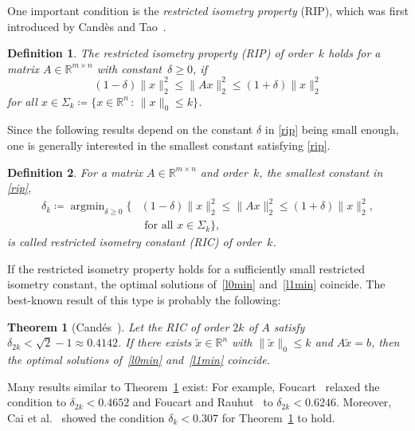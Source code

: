 \documentclass[journal]{IEEEtran}
\newtheorem{theorem}{Theorem}
\newtheorem{definition}{Definition}
\DeclareMathOperator*{\argmin}{argmin}
\newcommand{\suchthat}{\,:\,}
\newcommand{\define}{\coloneqq}
\newcommand{\Norm}[2]{\lVert{#1}\rVert_{#2}}
\newcommand{\R}{\mathds{R}}
\begin{document}
One important condition is the \emph{restricted isometry property} (RIP),
which was first introduced by Cand\`es and Tao~\cite{CT05}. 

\begin{definition}\label{ripdef}
  The \emph{restricted isometry property} (RIP) of order~$k$ holds for a
  matrix $A \in \R^{m \times n}$ with constant~$\delta \geq 0$, if
  \begin{equation}\label{rip}
    (1 - \delta) \Norm{x}{2}^2 \leq \Norm{Ax}{2}^2 \leq (1+\delta) \Norm{x}{2}^2
  \end{equation}
  for all $x \in \Sigma_k \define \{x \in \R^n \suchthat \Norm{x}{0} \leq k\}$.
\end{definition}

Since the following results depend on the constant $\delta$ in \eqref{rip} being
small enough, one is generally interested in the smallest constant satisfying
\eqref{rip}.

\begin{definition}\label{ricdef}
  For a matrix $A \in \R^{m \times n}$ and order~$k$, the smallest constant in 
  \eqref{rip},
  \begin{equation}\label{ric}
    \begin{aligned}
      \delta_k \define \argmin_{\delta \geq 0} \big\{&(1 - \delta) \Norm{x}{2}^2 \leq \Norm{Ax}{2}^2 \leq (1+\delta) \Norm{x}{2}^2 ,\\
      & \text{ for all }x \in \Sigma_k \big\},
    \end{aligned}
  \end{equation}
  is called \emph{restricted isometry constant} (RIC) of order~$k$.
\end{definition}

If the restricted isometry property holds for a sufficiently small
restricted isometry constant, the optimal solutions of~\eqref{l0min}
and~\eqref{l1min} coincide.  The best-known result of this type is probably
the following:
 
\begin{theorem}[Cand\'es~\cite{Can08}]\label{RIPsqrt2}
  Let the RIC of order $2k$ of $A$ satisfy $\delta_{2k} < \sqrt{2}-1 \approx 0.4142$. If there
  exists $\tilde{x} \in \R^n$ with $\Norm{\tilde{x}}{0} \leq k$ and
  $A\tilde{x} = b$, then the optimal solutions of~\eqref{l0min}
  and~\eqref{l1min} coincide.
\end{theorem}

Many results similar to Theorem~\ref{RIPsqrt2} exist: For
example, Foucart~\cite{fou10} relaxed the condition to $\delta_{2k} <
0.4652$ and Foucart and Rauhut~\cite{FouR13} to $\delta_{2k} < 0.6246$.
Moreover, Cai et al.~\cite{CWX10} showed the condition $\delta_k <
0.307$ for Theorem~\ref{RIPsqrt2} to hold. 
\end{document}
